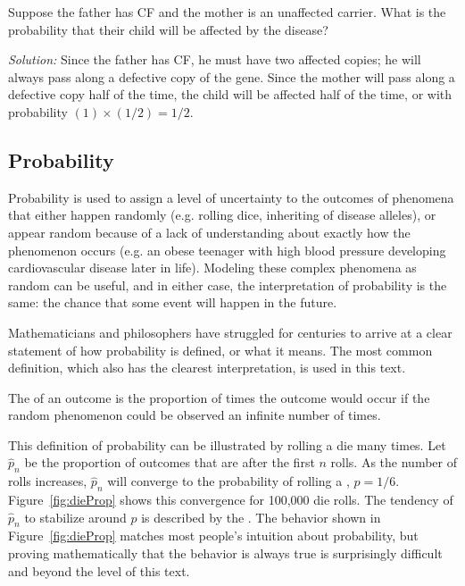 \begin{exercise}
Suppose the father has CF and the mother is an unaffected carrier. What is the probability that their child will be affected by the disease?

\textit{Solution:}  Since the father has CF, he must have two affected copies; he will always pass along a defective copy of the gene.  Since the mother will pass along a defective copy half of the time, the child will be affected half of the time, or with probability $(1) \times (1/2) = 1/2$.
\end{exercise}

\newpage

\subsection{Probability}


Probability is used to assign a level of uncertainty to the outcomes of phenomena that either happen randomly (e.g. rolling dice, inheriting of disease alleles), or appear random because of a lack of understanding about exactly how the phenomenon occurs (e.g. an obese teenager with high blood pressure developing cardiovascular disease later in life). Modeling these complex phenomena as random can be useful, and in either case, the interpretation of probability is the same: the chance that some event will happen in the future.

Mathematicians and philosophers have struggled for centuries to arrive at a clear statement of how probability is defined, or what it means. The most common definition, which also has the clearest interpretation, is used in this text.

\begin{termBox}{
The  of an outcome is the proportion of times the outcome would occur if the random phenomenon could be observed an infinite number of times.}
\end{termBox}


This definition of probability can be illustrated by rolling a die many times. Let $\hat{p}_n$ be the proportion of outcomes that are  after the first $n$ rolls. As the number of rolls increases, $\hat{p}_n$ will converge to the probability of rolling a , $p = 1/6$. Figure~\ref{fig:dieProp} shows this convergence for 100,000 die rolls. The tendency of $\hat{p}_n$ to stabilize around $p$ is described by the . The behavior shown in Figure~\ref{fig:dieProp} matches most people's intuition about probability, but proving mathematically that the behavior is always true is surprisingly difficult and beyond the level of this text.

